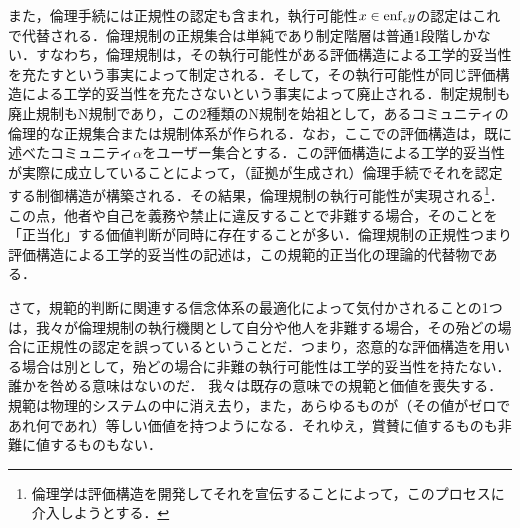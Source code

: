 また，倫理手続には正規性の認定も含まれ，執行可能性$ x\in\mathrm{enf}_{\epsilon}y $の認定はこれで代替される．倫理規制の正規集合は単純であり制定階層は普通1段階しかない．すなわち，倫理規制は，その執行可能性がある評価構造による工学的妥当性を充たすという事実によって制定される．そして，その執行可能性が同じ評価構造による工学的妥当性を充たさないという事実によって廃止される．制定規制も廃止規制もN規制であり，この2種類のN規制を始祖として，あるコミュニティの倫理的な正規集合または規制体系が作られる．なお，ここでの評価構造は，既に述べたコミュニティ$\alpha$をユーザー集合とする．この評価構造による工学的妥当性が実際に成立していることによって，（証拠が生成され）倫理手続でそれを認定する制御構造が構築される．その結果，倫理規制の執行可能性が実現される\footnote{倫理学は評価構造を開発してそれを宣伝することによって，このプロセスに介入しようとする．}．
この点，他者や自己を義務や禁止に違反することで非難する場合，そのことを「正当化」する価値判断が同時に存在することが多い．倫理規制の正規性つまり評価構造による工学的妥当性の記述は，この規範的正当化の理論的代替物である．

さて，規範的判断に関連する信念体系の最適化によって気付かされることの1つは，我々が倫理規制の執行機関として自分や他人を非難する場合，その殆どの場合に正規性の認定を誤っているということだ．つまり，恣意的な評価構造を用いる場合は別として，殆どの場合に非難の執行可能性は工学的妥当性を持たない．誰かを咎める意味はないのだ．
我々は既存の意味での規範と価値を喪失する．規範は物理的システムの中に消え去り，また，あらゆるものが（その値がゼロであれ何であれ）等しい価値を持つようになる．それゆえ，賞賛に値するものも非難に値するものもない．